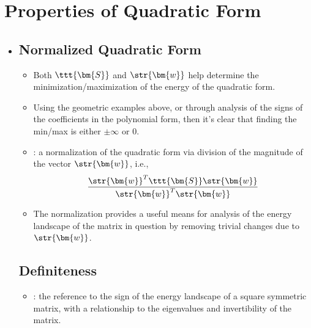 \section{Properties of Quadratic Form}\label{Properties of Quadratic Form}
\begin{itemize}
  \item[]
  
  \subsection{Normalized Quadratic Form}\label{Normalized Quadratic Form}
  \begin{itemize}
    \item Both \(\ttt{\bm{S}}\) and \(\str{\bm{w}}\) help determine the minimization/maximization of the energy of the quadratic form.
    \item Using the geometric examples above, or through analysis of the signs of the coefficients in the polynomial form, then it's clear that finding the min/max is either \(\pm \infty\) or 0.
    \item {}: a normalization of the quadratic form via division of the magnitude of the vector \(\str{\bm{w}}\), i.e.,
    \[%
    \frac{\str{\bm{w}}^T \ttt{\bm{S}} \str{\bm{w}}}{\str{\bm{w}}^T\str{\bm{w}}}
    \]%
    \item The normalization provides a useful means for analysis of the energy landscape of the matrix in question by removing trivial changes due to \(\str{\bm{w}}\).
  \end{itemize}

  \subsection{Definiteness}\label{Definiteness}
  \begin{itemize}
    \item {}: the reference to the sign of the energy landscape of a square symmetric matrix, with a relationship to the eigenvalues and invertibility of the matrix.
    

\end{itemize}
\end{itemize}
